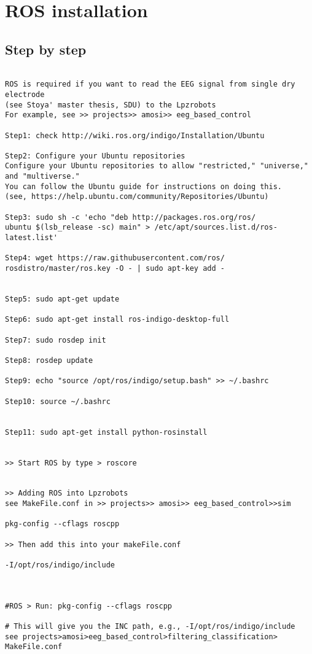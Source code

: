 \section{ROS installation}

\subsection{Step by step}

\begin{lstlisting}

ROS is required if you want to read the EEG signal from single dry electrode 
(see Stoya' master thesis, SDU) to the Lpzrobots
For example, see >> projects>> amosi>> eeg_based_control

Step1: check http://wiki.ros.org/indigo/Installation/Ubuntu 

Step2: Configure your Ubuntu repositories
Configure your Ubuntu repositories to allow "restricted," "universe," and "multiverse." 
You can follow the Ubuntu guide for instructions on doing this.
(see, https://help.ubuntu.com/community/Repositories/Ubuntu) 

Step3: sudo sh -c 'echo "deb http://packages.ros.org/ros/
ubuntu $(lsb_release -sc) main" > /etc/apt/sources.list.d/ros-latest.list'

Step4: wget https://raw.githubusercontent.com/ros/
rosdistro/master/ros.key -O - | sudo apt-key add -


Step5: sudo apt-get update

Step6: sudo apt-get install ros-indigo-desktop-full

Step7: sudo rosdep init

Step8: rosdep update

Step9: echo "source /opt/ros/indigo/setup.bash" >> ~/.bashrc

Step10: source ~/.bashrc


Step11: sudo apt-get install python-rosinstall


>> Start ROS by type > roscore


>> Adding ROS into Lpzrobots
see MakeFile.conf in >> projects>> amosi>> eeg_based_control>>sim

pkg-config --cflags roscpp

>> Then add this into your makeFile.conf

-I/opt/ros/indigo/include



#ROS > Run: pkg-config --cflags roscpp

# This will give you the INC path, e.g., -I/opt/ros/indigo/include
see projects>amosi>eeg_based_control>filtering_classification> MakeFile.conf


\end{lstlisting}
